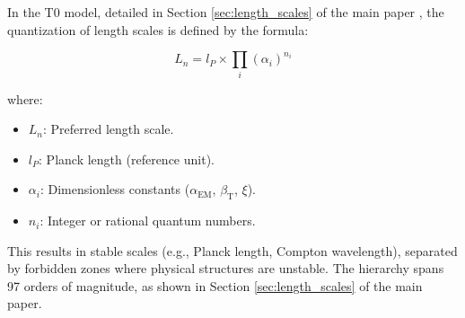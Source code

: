 \documentclass[12pt,a4paper]{article}
\newcommand{\alphaEM}{\alpha_{\text{EM}}}
\newcommand{\betaT}{\beta_{\text{T}}}
\begin{document}
	In the T0 model, detailed in Section \ref{sec:length_scales} of the main paper \cite{pascher_alphabeta_2025}, the quantization of length scales is defined by the formula:
	
	\begin{equation}
		L_n = l_P \times \prod_{i} (\alpha_i)^{n_i}
	\end{equation}
	
	where:
	\begin{itemize}
		\item $L_n$: Preferred length scale.
		\item $l_P$: Planck length (reference unit).
		\item $\alpha_i$: Dimensionless constants (\(\alphaEM\), \(\betaT\), \(\xi\)).
		\item $n_i$: Integer or rational quantum numbers.
	\end{itemize}
	
	This results in stable scales (e.g., Planck length, Compton wavelength), separated by forbidden zones where physical structures are unstable. The hierarchy spans 97 orders of magnitude, as shown in Section \ref{sec:length_scales} of the main paper.
	
\end{document}
